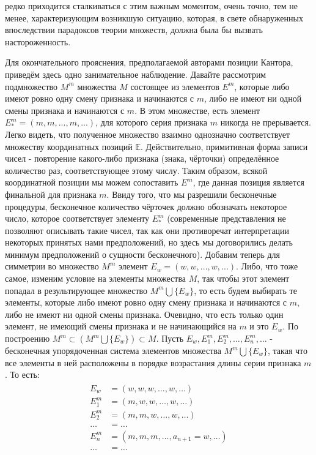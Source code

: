 \documentclass[12pt]{article}
\begin{document}
редко приходится сталкиваться с этим важным моментом, очень точно, тем не менее, характеризующим возникшую ситуацию, которая, в свете обнаруженных впоследствии парадоксов теории множеств, должна была бы вызвать настороженность. 

Для окончательного прояснения, предполагаемой авторами позиции Кантора, приведём здесь одно занимательное наблюдение. Давайте рассмотрим подмножество $M^m$ множества $M$ состоящее из элементов $E^m$, которые либо имеют ровно одну смену признака и начинаются с $m$, либо не имеют ни одной смены признака и начинаются с $m$. В этом множестве, есть элемент $E^m_* = (m, m, ..., m, ...)$, для которого серия признака $m$ никогда не прерывается. Легко видеть, что полученное множество взаимно однозначно соответствует множеству координатных позиций $\mathbb{E}$. Действительно, примитивная форма записи чисел - повторение какого-либо признака (знака, чёрточки) определённое количество раз, соответствующее этому числу. Таким образом, всякой координатной позиции мы можем сопоставить $E^m$, где данная позиция является финальной для признака $m$. Ввиду того, что мы разрешили бесконечные процедуры, бесконечное количество чёрточек должно обозначать некоторое число, которое соответствует элементу $E^m_*$ (современные представления не позволяют описывать такие чисел, так как они противоречат интерпретации некоторых принятых нами предположений, но здесь мы договорились делать минимум предположений о сущности бесконечного). Добавим теперь для симметрии во множество $M^m$ элемент $E_w = (w, w, ..., w, ...)$. Либо, что тоже самое, изменим условие на элементы множества $M$, так чтобы этот элемент попадал в результирующее множество $M^m \bigcup \{E_w\}$, то есть будем выбирать те элементы, которые либо имеют ровно одну смену признака и начинаются с $m$, либо не имеют ни одной смены признака. Очевидно, что есть только один элемент, не имеющий смены признака и не начинающийся на $m$ и это $E_w$. По построению $M^m \subset (M^m \bigcup \{E_w\}) \subset M$. Пусть $E_w, E^m_1, E^m_2, \dots, E^m_n, \dots$ - бесконечная упорядоченная система элементов множества $M^m \bigcup \{E_w\}$, такая что все элементы в ней расположены в порядке возрастания длины серии признака $m$. То есть:
\begin{align}
\begin{split}
E_w &= (w, w, w, \dots, w, \dots)\\
E^m_1 &= (m, w, w, \dots, w, \dots)\\
E^m_2 &= (m, m, w, \dots, w, \dots)\\
\dots &= \dots\\
E^m_n &= (m, m, m, \dots, a_{n+1} = w, \dots)\\
\dots &= \dots
\end{split}
\end{align}
\end{document}
